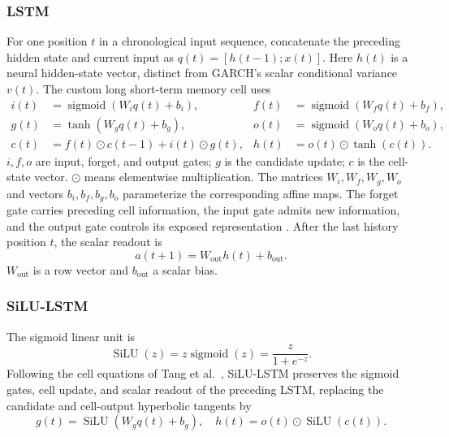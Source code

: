 \documentclass[12pt,a4paper]{article}
\numberwithin{equation}{section}
\numberwithin{table}{section}
\numberwithin{figure}{section}
\begin{document}
\subsubsection{LSTM}
For one position $t$ in a chronological input sequence, concatenate the preceding hidden state and current input as $q(t)=[h(t-1);x(t)]$. Here $h(t)$ is a neural hidden-state vector, distinct from GARCH's scalar conditional variance $v(t)$. The custom long short-term memory cell uses
\begin{equation}\label{eq:methods-lstm-if}
\begin{aligned}
i(t)&=\operatorname{sigmoid}(W_iq(t)+b_i),&
f(t)&=\operatorname{sigmoid}(W_fq(t)+b_f),\\
g(t)&=\tanh(W_gq(t)+b_g),&
o(t)&=\operatorname{sigmoid}(W_oq(t)+b_o),\\
c(t)&=f(t)\odot c(t-1)+i(t)\odot g(t),&
h(t)&=o(t)\odot\tanh(c(t)).
\end{aligned}
\end{equation}
$i,f,o$ are input, forget, and output gates; $g$ is the candidate update; $c$ is the cell-state vector. $\odot$ means elementwise multiplication. The matrices $W_i,W_f,W_g,W_o$ and vectors $b_i,b_f,b_g,b_o$ parameterize the corresponding affine maps. The forget gate carries preceding cell information, the input gate admits new information, and the output gate controls its exposed representation \cite{hochreiter1997}. After the last history position $t$, the scalar readout is
\begin{equation}\label{eq:methods-lstm-readout}
a(t+1)=W_{\mathrm{out}}h(t)+b_{\mathrm{out}}.
\end{equation}
$W_{\mathrm{out}}$ is a row vector and $b_{\mathrm{out}}$ a scalar bias.

\subsubsection{SiLU-LSTM}
The sigmoid linear unit is
\begin{equation}\label{eq:methods-silu}
\operatorname{SiLU}(z)=z\operatorname{sigmoid}(z)=\frac{z}{1+e^{-z}}.
\end{equation}
Following the cell equations of Tang et al.~\cite{tang2023}, SiLU-LSTM preserves the sigmoid gates, cell update, and scalar readout of the preceding LSTM, replacing the candidate and cell-output hyperbolic tangents by
\begin{equation}\label{eq:methods-silu-lstm}
g(t)=\operatorname{SiLU}(W_gq(t)+b_g),\quad
h(t)=o(t)\odot\operatorname{SiLU}(c(t)).
\end{equation}
\end{document}
